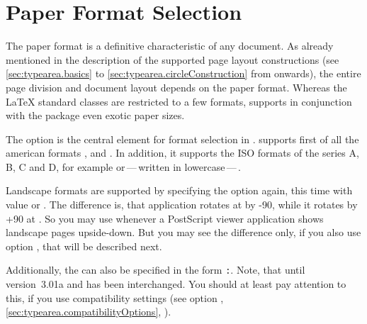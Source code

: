 \section{Paper Format Selection}
\label{sec:typearea.paperTypes}%
%

The paper format is a definitive characteristic of any document. As
already mentioned in the description of the supported page layout
constructions (see \autoref{sec:typearea.basics} to
\autoref{sec:typearea.circleConstruction} from
 onwards), the entire page division
and document layout depends on the paper format. Whereas the {\LaTeX}
standard classes are restricted to a few formats, {\KOMAScript}
supports in conjunction with the  package even
exotic paper sizes.


%
%
\begin{Declaration}
\end{Declaration}%
The option  is the
central element for format selection in \KOMAScript.  
supports first of all the american formats ,
 and . In addition, it supports the
ISO formats of the series A, B, C and D, for example 
or\,---\,written in lowercase\,---\,. 

Landscape formats are supported by specifying the option again, this time with
value  or
. The difference is,
that application  rotates at  by
-90\Unit{\textdegree}, while it rotates by +90\Unit{\textdegree} at
. So you may use  whenever a PostScript
viewer application shows landscape pages upside-down. But you may see the
difference only, if you also use option , that will be
described next.

Additionally, the  can also be specified in the form
\texttt{:}. Note, that until
version~3.01a  and
 has been interchanged. You should at least pay attention to
this, if you use compatibility settings (see option
,
\autoref{sec:typearea.compatibilityOptions},
).

